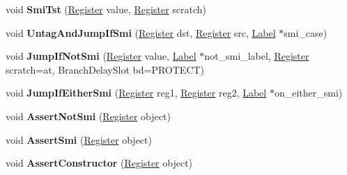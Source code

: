 \begin{DoxyCompactItemize}
void {\bfseries Smi\+Tst} (\mbox{\hyperlink{classv8_1_1internal_1_1Register}{Register}} value, \mbox{\hyperlink{classv8_1_1internal_1_1Register}{Register}} scratch)
\item 
\mbox{\label{classv8_1_1internal_1_1MacroAssembler_a9cb3d8cb77fca08c8db1fee15b8c192c}} 
void {\bfseries Untag\+And\+Jump\+If\+Smi} (\mbox{\hyperlink{classv8_1_1internal_1_1Register}{Register}} dst, \mbox{\hyperlink{classv8_1_1internal_1_1Register}{Register}} src, \mbox{\hyperlink{classv8_1_1internal_1_1Label}{Label}} $\ast$smi\+\_\+case)
\item 
\mbox{\label{classv8_1_1internal_1_1MacroAssembler_a611e534bb0c253fd10d03f7f3ac01ef5}} 
void {\bfseries Jump\+If\+Not\+Smi} (\mbox{\hyperlink{classv8_1_1internal_1_1Register}{Register}} value, \mbox{\hyperlink{classv8_1_1internal_1_1Label}{Label}} $\ast$not\+\_\+smi\+\_\+label, \mbox{\hyperlink{classv8_1_1internal_1_1Register}{Register}} scratch=at, Branch\+Delay\+Slot bd=P\+R\+O\+T\+E\+CT)
\item 
\mbox{\label{classv8_1_1internal_1_1MacroAssembler_a781acc0a777ee0a49f000f204797e3d0}} 
void {\bfseries Jump\+If\+Either\+Smi} (\mbox{\hyperlink{classv8_1_1internal_1_1Register}{Register}} reg1, \mbox{\hyperlink{classv8_1_1internal_1_1Register}{Register}} reg2, \mbox{\hyperlink{classv8_1_1internal_1_1Label}{Label}} $\ast$on\+\_\+either\+\_\+smi)
\item 
\mbox{\label{classv8_1_1internal_1_1MacroAssembler_af70fc3cc2353f24bf73f868930906bcc}} 
void {\bfseries Assert\+Not\+Smi} (\mbox{\hyperlink{classv8_1_1internal_1_1Register}{Register}} object)
\item 
\mbox{\label{classv8_1_1internal_1_1MacroAssembler_aca8963bd0a98454d6ad0e4aa34d8cab8}} 
void {\bfseries Assert\+Smi} (\mbox{\hyperlink{classv8_1_1internal_1_1Register}{Register}} object)
\item 
\mbox{\label{classv8_1_1internal_1_1MacroAssembler_a6a0f31c1173192d0ff1e325d711e099f}} 
void {\bfseries Assert\+Constructor} (\mbox{\hyperlink{classv8_1_1internal_1_1Register}{Register}} object)

\end{DoxyCompactItemize}
